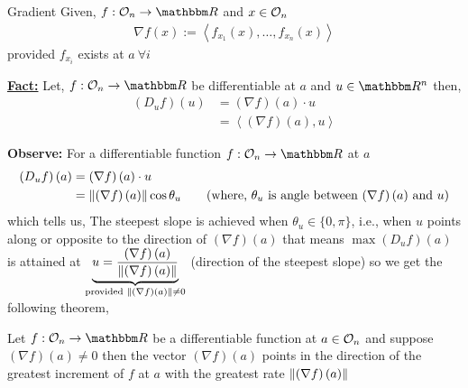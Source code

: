 \documentclass[Analysis-3]{subfiles}
\begin{document}
\begin{Def}{Gradient}{}
  Given, $ f:\Op{n}\to\R $ and $ x\in\mathcal{O}_{n} $
  \begin{align*}
    \nabla f(x) := \left\langle f_{x_1}(x), \ldots, f_{x_n}(x) \right\rangle
  \end{align*}
  provided $ f_{x_i} $ exists at $ a \ \forall i $
\end{Def}

\textbf{\underline{Fact:}} Let, $ f:\Op{n}\to\R $ be differentiable at $ a $ and $ u\in\R^n $ then,
\begin{align*}
  \left( D_uf \right)(u) & = \left( \nabla f\right)(a)\cdot u \\ &= \left\langle \left( \nabla f \right)(a), u \right\rangle
\end{align*}

\textbf{Observe:} For a differentiable function $ f: \Op{n} \to \R $ at $ a $
\begin{align*}
  \left( D_uf \right)(a) & = \left( \nabla f\right)(a)\cdot u                                                                                            \\
                         & = \norm{\left( \nabla f\right)(a)}\cos{\theta_u} \tag{where, $\theta_u$ is angle between $\left( \nabla f\right)(a)$ and $u$}
\end{align*}
which tells us, The steepest slope is achieved when $ \theta_u \in \{0, \pi\} $, i.e., when $ u $ points along or opposite to the direction of $ \left( \nabla f\right)(a) $
that means $ \max \left( D_uf \right)(a) $ is attained at $ \underbrace{u = \frac{\left( \nabla f\right)(a)}{\norm{\left( \nabla f\right)(a)}}}_{\text{provided } \norm{\left( \nabla f\right)(a)} \not=0 } $ (direction of the steepest slope)
so we get the following theorem,
\begin{Thm}{}{}
  Let $ f: \Op{n} \to \R $ be a differentiable function at $ a \in \mathcal{O}_{n} $ and suppose $ \left( \nabla f\right)(a) \not= 0 $ then the vector $\left( \nabla f\right)(a)$ points in the direction of the greatest increment of $ f $ at $ a $ with the greatest rate $ \norm{\left( \nabla f\right)(a)} $
\end{Thm}
\end{document}
